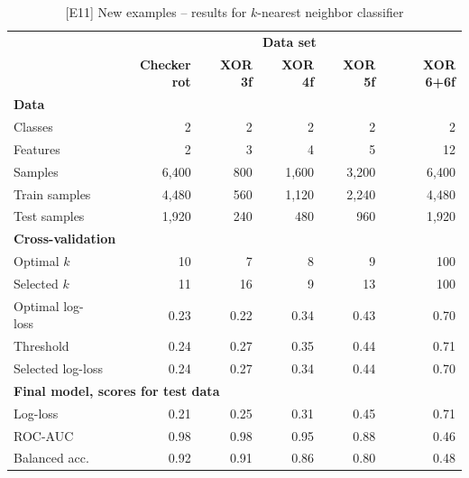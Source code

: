 %
\begin{table}
\caption{[E11]  New examples -- results for $k$-nearest neighbor classifier}
\label{tab_e11}
%
\begin{center}
\small
\begin{tabular}{|lrrrrr|}
\hline
&\multicolumn{5}{c|}{\textbf{\hrulefill\ Data set \hrulefill}}\\
&\textbf{Checker rot}&\textbf{XOR 3f}&\textbf{XOR 4f}&\textbf{XOR 5f}&\textbf{XOR 6+6f}\\
\multicolumn{6}{|l|}{\textbf{Data}}\\
Classes&2&2&2&2&2\\
Features&2&3&4&5&12\\
Samples&6,400&800&1,600&3,200&6,400\\
Train samples&4,480&560&1,120&2,240&4,480\\
Test samples&1,920&240&480&960&1,920\\
\multicolumn{6}{|l|}{\textbf{Cross-validation}}\\
Optimal $k$&10&7&8&9&100\\
Selected $k$&11&16&9&13&100\\
Optimal log-loss&0.23&0.22&0.34&0.43&0.70\\
Threshold&0.24&0.27&0.35&0.44&0.71\\
Selected log-loss&0.24&0.27&0.34&0.44&0.70\\
\multicolumn{6}{|l|}{\textbf{Final model, scores for test data}}\\
Log-loss&0.21&0.25&0.31&0.45&0.71\\
ROC-AUC&0.98&0.98&0.95&0.88&0.46\\
Balanced acc.&0.92&0.91&0.86&0.80&0.48\\
\hline
\end{tabular}
\end{center}
\end{table}
%
